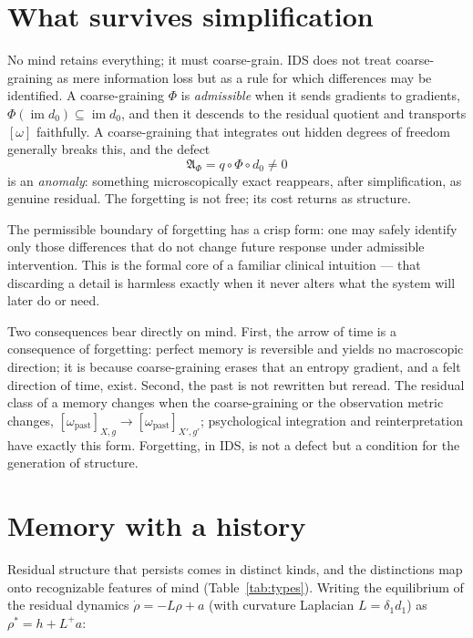 \documentclass[11pt,a4paper]{article}
\theoremstyle{plain}
\begin{document}
\section{What survives simplification}\label{sec:coarse}

No mind retains everything; it must coarse-grain. IDS does not treat coarse-graining as mere information
loss but as a rule for which differences may be identified. A coarse-graining $\Phi$ is
\emph{admissible} when it sends gradients to gradients, $\Phi(\operatorname{im}d_0)\subseteq
\operatorname{im}d_0$, and then it descends to the residual quotient and transports $[\omega]$ faithfully.
A coarse-graining that integrates out hidden degrees of freedom generally breaks this, and the defect
\begin{equation}
\mathfrak A_\Phi=q\circ\Phi\circ d_0\ne 0
\end{equation}
is an \emph{anomaly}: something microscopically exact reappears, after simplification, as genuine
residual. The forgetting is not free; its cost returns as structure.

The permissible boundary of forgetting has a crisp form: one may safely identify only those differences
that do not change future response under admissible intervention. This is the formal core of a familiar
clinical intuition --- that discarding a detail is harmless exactly when it never alters what the system
will later do or need.

Two consequences bear directly on mind. First, the arrow of time is a consequence of forgetting: perfect
memory is reversible and yields no macroscopic direction; it is because coarse-graining erases that an
entropy gradient, and a felt direction of time, exist. Second, the past is not rewritten but reread. The
residual class of a memory changes when the coarse-graining or the observation metric changes,
$[\omega_{\mathrm{past}}]_{X,g}\to[\omega_{\mathrm{past}}]_{X',g'}$; psychological integration and
reinterpretation have exactly this form. Forgetting, in IDS, is not a defect but a condition for the
generation of structure.

\section{Memory with a history}\label{sec:types}

Residual structure that persists comes in distinct kinds, and the distinctions map onto recognizable
features of mind (Table~\ref{tab:types}). Writing the equilibrium of the residual dynamics
$\dot\rho=-L\rho+a$ (with curvature Laplacian $L=\delta_1d_1$) as $\rho^\ast=h+L^{+}a$:
\end{document}

